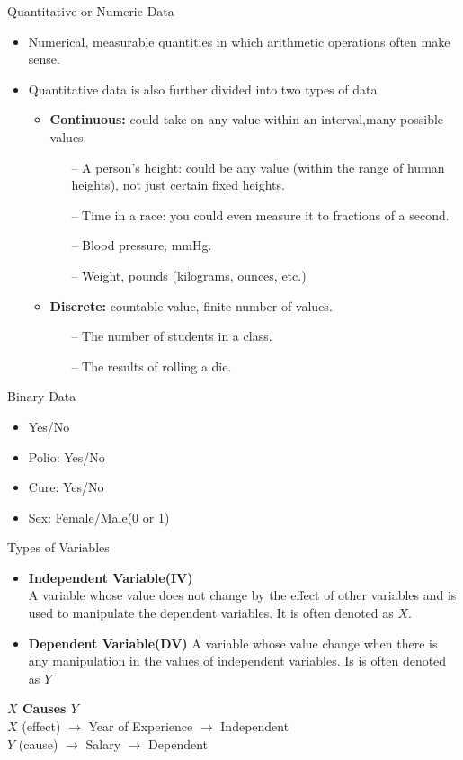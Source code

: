\begin{frame}[t]{Quantitative or Numeric Data}
	\begin{itemize}
		\item Numerical, measurable quantities in which arithmetic
		operations often make sense.
		\item Quantitative data is also further divided into two types of data
		\begin{itemize}
			\item \textbf{Continuous:} could take on any value within an 
			interval,many possible values.
			\begin{itemize}
				\item[--] A person's height: could be any value (within the 
				range 
				of human heights), not just certain fixed heights. 
				\item[--] Time in a race: you could even measure it to 
				fractions of 
				a second.
				\item [--]Blood pressure, mmHg.
				\item [--]Weight, pounds (kilograms, ounces, etc.)
			\end{itemize}
			\item \textbf{Discrete:} countable value, finite number of values.
			\begin{itemize}
				\item[--] The number of students in a class.
				\item[--] The results of rolling a die.
			\end{itemize}
	\end{itemize}
	\end{itemize}
\end{frame}

\begin{frame}[t]{Binary Data}
	\begin{itemize}
		\item Yes/No
		\item Polio: Yes/No
		\item Cure: Yes/No
		\item Sex: Female/Male(0 or 1)
	\end{itemize}
\end{frame}

\begin{frame}[t]{Types of Variables}
	\begin{itemize}
		\item \textbf{Independent Variable(IV)} \\
		A variable whose value does not change by the effect of other variables 
		and is used to manipulate the dependent variables. It is often denoted 
		as $X$. 
		\item \textbf{Dependent Variable(DV)} 
		A variable whose value change when there is any manipulation in the 
		values of independent variables. Is is often denoted as $Y$
	\end{itemize}
\centering
\textbf{$X$ Causes $Y$} \\ 
$X$ (effect) $\rightarrow$ Year of Experience $\rightarrow$ Independent \\ 
$Y$ (cause) $\rightarrow$ Salary $\rightarrow$ Dependent
\end{frame}


